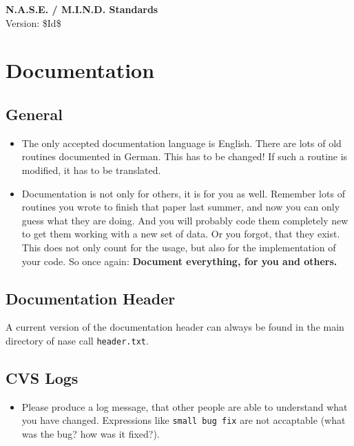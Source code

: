 \documentclass[12pt]{article}
\begin{document}
\begin{titlepage}
\begin{center}
{\Huge\textbf{N.A.S.E. / M.I.N.D. Standards}\\[2cm]}
Version: \$Id$ $\$ 
\end{center}
\vfill
\tableofcontents
\vfill
\vfill
\end{titlepage}

\section{Documentation}
\subsection{General}
\begin{itemize}
\item The only accepted documentation language is English. There are lots of old routines documented in German. This has to be changed! If such a routine is modified, it has to be translated. 
\item Documentation is not only for others, it is for you as well. Remember lots of routines you wrote to finish that paper last summer, and now you can only guess what they are doing. And you will probably code them completely new to get them working with a new set of data. Or you forgot, that they exist. This does not only count for the usage, but also for the implementation of your code. So once again: \textbf{Document everything, for you and others.}
\end{itemize}

\subsection{Documentation Header}
A current version of the documentation header can always be found in the main directory of nase call \texttt{header.txt}.




\subsection{CVS Logs}
\begin{itemize}
\item Please produce a log message, that other people are able to understand what you have changed. Expressions like \texttt{small bug fix} are not accaptable (what was the bug? how was it fixed?).  
\end{itemize}
\end{document}
